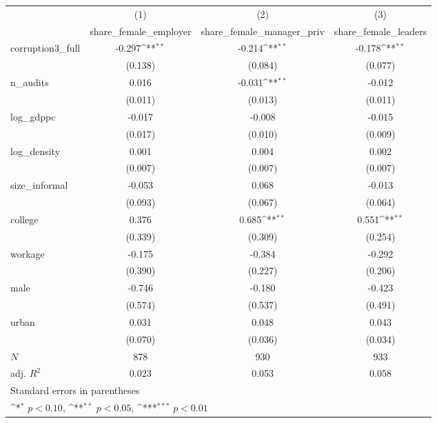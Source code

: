 {
\def\sym#1{\ifmmode^{#1}\else\(^{#1}\)\fi}
\begin{tabular}{l*{3}{c}}
\hline\hline
            &\multicolumn{1}{c}{(1)}&\multicolumn{1}{c}{(2)}&\multicolumn{1}{c}{(3)}\\
            &\multicolumn{1}{c}{share\_female\_employer}&\multicolumn{1}{c}{share\_female\_manager\_priv}&\multicolumn{1}{c}{share\_female\_leaders}\\
\hline
corruption3\_full&      -0.297\sym{**} &      -0.214\sym{**} &      -0.178\sym{**} \\
            &     (0.138)         &     (0.084)         &     (0.077)         \\
[1em]
n\_audits    &       0.016         &      -0.031\sym{**} &      -0.012         \\
            &     (0.011)         &     (0.013)         &     (0.011)         \\
[1em]
log\_gdppc   &      -0.017         &      -0.008         &      -0.015         \\
            &     (0.017)         &     (0.010)         &     (0.009)         \\
[1em]
log\_density &       0.001         &       0.004         &       0.002         \\
            &     (0.007)         &     (0.007)         &     (0.007)         \\
[1em]
size\_informal&      -0.053         &       0.068         &      -0.013         \\
            &     (0.093)         &     (0.067)         &     (0.064)         \\
[1em]
college     &       0.376         &       0.685\sym{**} &       0.551\sym{**} \\
            &     (0.339)         &     (0.309)         &     (0.254)         \\
[1em]
workage     &      -0.175         &      -0.384         &      -0.292         \\
            &     (0.390)         &     (0.227)         &     (0.206)         \\
[1em]
male        &      -0.746         &      -0.180         &      -0.423         \\
            &     (0.574)         &     (0.537)         &     (0.491)         \\
[1em]
urban       &       0.031         &       0.048         &       0.043         \\
            &     (0.070)         &     (0.036)         &     (0.034)         \\
\hline
\(N\)       &         878         &         930         &         933         \\
adj. \(R^{2}\)&       0.023         &       0.053         &       0.058         \\
\hline\hline
\multicolumn{4}{l}{\footnotesize Standard errors in parentheses}\\
\multicolumn{4}{l}{\footnotesize \sym{*} \(p<0.10\), \sym{**} \(p<0.05\), \sym{***} \(p<0.01\)}\\
\end{tabular}
}
